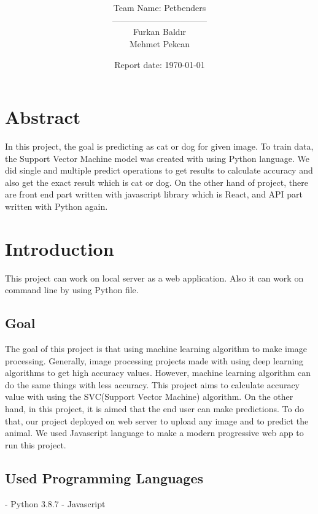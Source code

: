 \documentclass[onecolumn]{article}
\title{\spacecaps{Data Mining Final Project \\ Image processing to predict as cat or dog}\\ \normalsize \spacesc{CENG 3521, DATA MINING} }
\author{Team Name: Petbenders \\ --------------------------------- \\ Furkan Baldır \\ Mehmet Pekcan}
\date{Report date: \today}
\begin{document}
\maketitle

\section*{Abstract}
In this project, the goal is predicting as cat or dog for given image. To train data, the Support Vector Machine model was created with using Python language. We did single and multiple predict operations to get results to calculate accuracy and also get the exact result which is cat or dog. On the other hand of project, there are front end part written with javascript library which is React, and API part written with Python again. 

\section{Introduction}
This project can work on local server as a web application. Also it can work on command line by using Python file.

\subsection{Goal}
The goal of this project is that using machine learning algorithm to make image processing. Generally, image processing projects made with using deep learning algorithms to get high accuracy values. However, machine learning algorithm can do the same things with less accuracy. This project aims to calculate accuracy value with using the SVC(Support Vector Machine) algorithm.
\newline
\newline
On the other hand, in this project, it is aimed that the end user can make predictions. To do that, our project deployed on web server to upload any image and to predict the animal. We used Javascript language to make a modern progressive web app to run this project. 

\subsection{Used Programming Languages}
- Python 3.8.7
\newline
- Javascript
\end{document}
